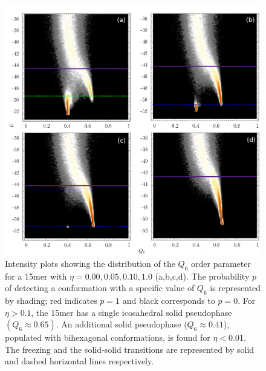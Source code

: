\documentclass[12pt]{report}
\begin{document}
\begin{figure}
\center
	\includegraphics[width=\textwidth]{chapter6Figs/structuralAnalysis15.eps}
\caption{\label{fig:intensityPlots15} Intensity plots showing the distribution of the 
$Q_{6}$ order parameter for a 15mer with $\eta = 0.00, 0.05, 0.10, 1.0$ (a,b,c,d).
The probability $p$ of detecting a conformation with a specific value of $Q_{6}$ is represented by shading; red indicates $p=1$ and black corresponds to $p=0$.  For $\eta > 0.1$, the 15mer has a single icosahedral solid pseudophase $(Q_{6} \approx 0.65)$. An additional solid pseudophase  ($Q_{6} \approx 0.41$), populated with  bihexagonal conformations, is found for $\eta < 0.01$. The freezing and the solid-solid transitions are represented by solid and dashed horizontal lines respectively.}
\end{figure}
%
\end{document}
